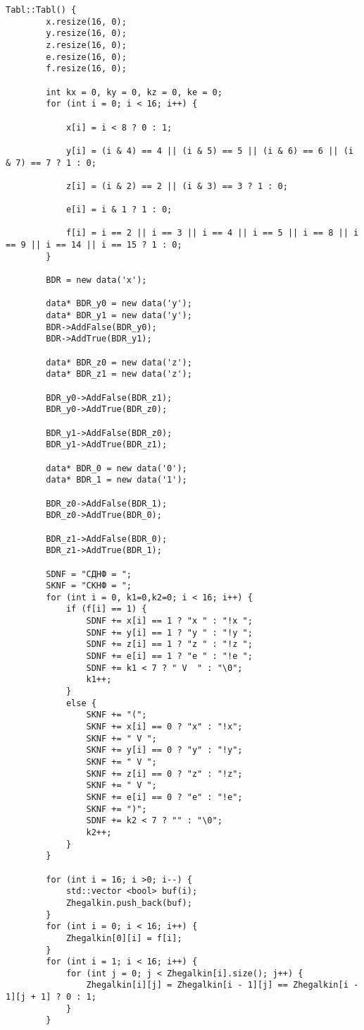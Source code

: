 \documentclass[10pt,a4paper,final]{article} %
\begin{document}
\begin{lstlisting}[caption={Конструктор Tabl}]
	Tabl::Tabl() {
		x.resize(16, 0);
		y.resize(16, 0);
		z.resize(16, 0);
		e.resize(16, 0);
		f.resize(16, 0);
		
		int kx = 0, ky = 0, kz = 0, ke = 0;
		for (int i = 0; i < 16; i++) {
			
			x[i] = i < 8 ? 0 : 1;
			
			y[i] = (i & 4) == 4 || (i & 5) == 5 || (i & 6) == 6 || (i & 7) == 7 ? 1 : 0;
			
			z[i] = (i & 2) == 2 || (i & 3) == 3 ? 1 : 0;
			
			e[i] = i & 1 ? 1 : 0;
			
			f[i] = i == 2 || i == 3 || i == 4 || i == 5 || i == 8 || i == 9 || i == 14 || i == 15 ? 1 : 0;
		}
		
		BDR = new data('x');
		
		data* BDR_y0 = new data('y');
		data* BDR_y1 = new data('y');
		BDR->AddFalse(BDR_y0);
		BDR->AddTrue(BDR_y1);
		
		data* BDR_z0 = new data('z');
		data* BDR_z1 = new data('z');
		
		BDR_y0->AddFalse(BDR_z1);
		BDR_y0->AddTrue(BDR_z0);
		
		BDR_y1->AddFalse(BDR_z0);
		BDR_y1->AddTrue(BDR_z1);
		
		data* BDR_0 = new data('0');
		data* BDR_1 = new data('1');
		
		BDR_z0->AddFalse(BDR_1);
		BDR_z0->AddTrue(BDR_0);
		
		BDR_z1->AddFalse(BDR_0);
		BDR_z1->AddTrue(BDR_1);
		
		SDNF = "СДНФ = ";
		SKNF = "СКНФ = ";
		for (int i = 0, k1=0,k2=0; i < 16; i++) {
			if (f[i] == 1) {
				SDNF += x[i] == 1 ? "x " : "!x ";
				SDNF += y[i] == 1 ? "y " : "!y ";
				SDNF += z[i] == 1 ? "z " : "!z ";
				SDNF += e[i] == 1 ? "e " : "!e ";
				SDNF += k1 < 7 ? " V  " : "\0";
				k1++;
			}
			else {
				SKNF += "(";
				SKNF += x[i] == 0 ? "x" : "!x";
				SKNF += " V ";
				SKNF += y[i] == 0 ? "y" : "!y";
				SKNF += " V ";
				SKNF += z[i] == 0 ? "z" : "!z";
				SKNF += " V ";
				SKNF += e[i] == 0 ? "e" : "!e";
				SKNF += ")";
				SDNF += k2 < 7 ? "" : "\0";
				k2++;
			}
		}
		
		for (int i = 16; i >0; i--) {
			std::vector <bool> buf(i);
			Zhegalkin.push_back(buf);
		}
		for (int i = 0; i < 16; i++) {
			Zhegalkin[0][i] = f[i];
		}
		for (int i = 1; i < 16; i++) {
			for (int j = 0; j < Zhegalkin[i].size(); j++) {
				Zhegalkin[i][j] = Zhegalkin[i - 1][j] == Zhegalkin[i - 1][j + 1] ? 0 : 1;
			}
		}
		

\end{lstlisting}
\end{document}

